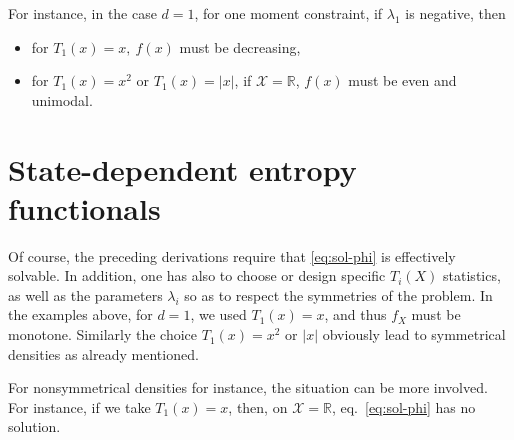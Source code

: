 \documentclass[english,sort&compress]{elsarticle}
\theoremstyle{definition}
\theoremstyle{plain}
\theoremstyle{plain}
\def\Rset{\mathbb{R}}
\def\X{\mathcal{X}}
\begin{document}
For instance, in the case $d =  1$, for one moment constraint, if $\lambda_1$ is
negative, then
%
\begin{itemize}
\item for $T_1(x) = x, \: f(x)$ must be decreasing, 
\item for $T_1(x) = x^2$ or $T_1(x) = |x|$, if $\X = \Rset$, $f(x)$ must be even
  and unimodal.
\end{itemize}



\section{State-dependent entropy functionals}
\label{sec:MultiformEnt}

Of  course,  the  preceding   derivations  require  that  \eqref{eq:sol-phi}  is
effectively solvable.   In addition, one has  also to choose  or design specific
$T_i(X)$ statistics, as well as the  parameters $\lambda_i$ so as to respect the
symmetries of the  problem. In the examples above, for $d=1$,  we used $T_1(x) =
x$, and  thus $f_X$ must  be monotone.  Similarly  the choice $T_1(x) =  x^2$ or
$|x|$ obviously lead to symmetrical densities as already mentioned.

For nonsymmetrical densities  for instance, the situation can  be more involved.
For   instance,  if   we  take   $T_1(x)   =  x$,   then,  on   $\X  =   \Rset$,
eq.~\eqref{eq:sol-phi} has no solution.

\
\end{document}

